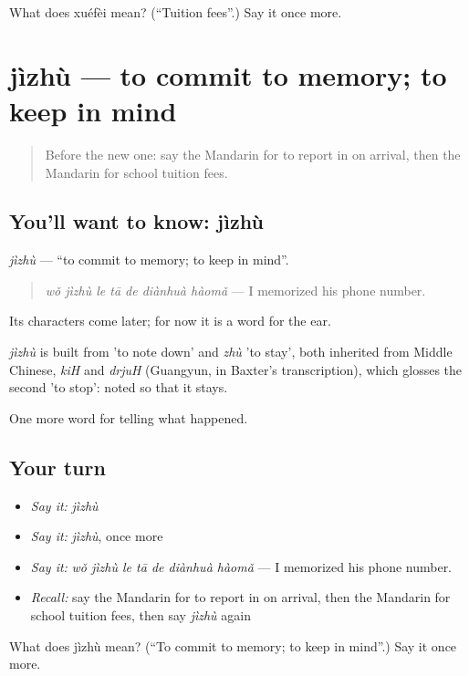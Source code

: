 \begin{tcolorbox}[breakable,colback=teal!4,colframe=teal!35!black,title={Before you move on}]
What does xuéfèi mean? (\textquotedblleft{}Tuition fees\textquotedblright{}.) Say it once more.
\end{tcolorbox}
\section[jìzhù]{jìzhù — to commit to memory; to keep in mind}

\label{lesson:ZH-C304-jizhu}



\begin{quote}
Before the new one: say the Mandarin for to report in on arrival, then the Mandarin for school tuition fees.
\end{quote}

\subsection*{You'll want to know: jìzhù}
\emph{jìzhù} — \textquotedblleft{}to commit to memory; to keep in mind\textquotedblright{}.

\begin{quote}
\emph{wǒ jìzhù le tā de diànhuà hàomǎ} — I memorized his phone number.
\end{quote}

Its characters come later; for now it is a word for the ear.

\begin{cousinweb}
\emph{jìzhù} is built from  'to note down' and \emph{zhù} 'to stay', both inherited from Middle Chinese, \emph{kiH} and \emph{drjuH} (Guangyun, in Baxter's transcription), which glosses the second 'to stop': noted so that it stays.
\end{cousinweb}

\begin{grammarlens}[title={What you've built}]
One more word for telling what happened.
\end{grammarlens}

\subsection*{Your turn}
\begin{itemize}
\raggedright
  \item \emph{Say it:} \emph{jìzhù}
  \item \emph{Say it:} \emph{jìzhù}, once more
  \item \emph{Say it:} \emph{wǒ jìzhù le tā de diànhuà hàomǎ} — I memorized his phone number.
  \item \emph{Recall:} say the Mandarin for to report in on arrival, then the Mandarin for school tuition fees, then say \emph{jìzhù} again
\end{itemize}

\begin{tcolorbox}[breakable,colback=teal!4,colframe=teal!35!black,title={Before you move on}]
What does jìzhù mean? (\textquotedblleft{}To commit to memory; to keep in mind\textquotedblright{}.) Say it once more.
\end{tcolorbox}
